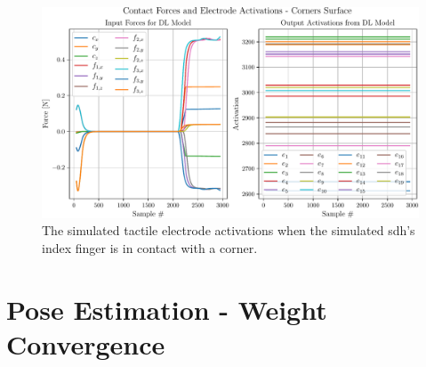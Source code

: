 \begin{figure}[!h]
	\begin{center}
		\includegraphics[width=\textwidth]{chapters/1-tactile-perception/fig/matplotlib/corners-contact-graph.pdf}
	\end{center}
	\caption{The simulated tactile electrode activations when the simulated \gls{sdh}'s index finger is in contact with a corner.}
	\label{app:corner-contact-graph}
\end{figure}

\chapter{Pose Estimation - Weight Convergence}\label{app:pose-estimation-weight-convergence}

